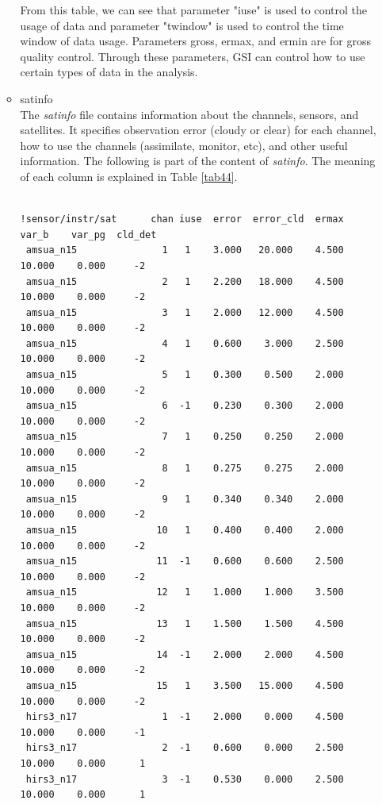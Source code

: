 \begin{enumerate}[leftmargin=*]
\begin{itemize}[leftmargin=*]
From this table, we can see that parameter "iuse" is used to control the usage of data and parameter "twindow" is used to control the time window of data usage. Parameters gross, ermax, and ermin are for gross quality control. Through these parameters, GSI can control how to use certain types of data in the analysis.\\

\item satinfo\\

The \textit{satinfo} file contains information about the channels, sensors, and satellites.  It specifies observation error (cloudy or clear) for each channel, how to use the channels (assimilate, monitor, etc), and other useful information. The following is part of the content of \textit{satinfo}. The meaning of each column is explained in Table \ref{tab44}.

\begin{scriptsize}
\begin{verbatim}

!sensor/instr/sat      chan iuse  error  error_cld  ermax   var_b    var_pg  cld_det
 amsua_n15               1   1    3.000   20.000    4.500   10.000    0.000     -2
 amsua_n15               2   1    2.200   18.000    4.500   10.000    0.000     -2
 amsua_n15               3   1    2.000   12.000    4.500   10.000    0.000     -2
 amsua_n15               4   1    0.600    3.000    2.500   10.000    0.000     -2
 amsua_n15               5   1    0.300    0.500    2.000   10.000    0.000     -2
 amsua_n15               6  -1    0.230    0.300    2.000   10.000    0.000     -2
 amsua_n15               7   1    0.250    0.250    2.000   10.000    0.000     -2
 amsua_n15               8   1    0.275    0.275    2.000   10.000    0.000     -2
 amsua_n15               9   1    0.340    0.340    2.000   10.000    0.000     -2
 amsua_n15              10   1    0.400    0.400    2.000   10.000    0.000     -2
 amsua_n15              11  -1    0.600    0.600    2.500   10.000    0.000     -2
 amsua_n15              12   1    1.000    1.000    3.500   10.000    0.000     -2
 amsua_n15              13   1    1.500    1.500    4.500   10.000    0.000     -2
 amsua_n15              14  -1    2.000    2.000    4.500   10.000    0.000     -2
 amsua_n15              15   1    3.500   15.000    4.500   10.000    0.000     -2
 hirs3_n17               1  -1    2.000    0.000    4.500   10.000    0.000     -1
 hirs3_n17               2  -1    0.600    0.000    2.500   10.000    0.000      1
 hirs3_n17               3  -1    0.530    0.000    2.500   10.000    0.000      1
\end{verbatim}
\end{scriptsize}


\end{itemize}
\end{enumerate}

